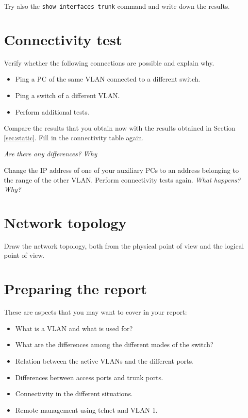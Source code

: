 Try also the \texttt{show interfaces trunk} command and write down the results.

\section{Connectivity test}

Verify whether the following connections are possible and explain why.
\begin{itemize}
\item Ping a PC of the same VLAN connected to a different switch.
\item Ping a  switch of a different VLAN.
\item Perform additional tests.
\end{itemize}

Compare the results that you obtain now with the results obtained in Section \ref{sec:static}.
Fill in the connectivity table again.

\emph{Are there any differences? Why}

Change the IP address of one of your auxiliary PCs to an address belonging to the range of the other VLAN.
Perform connectivity tests again.
\emph{What happens? Why?}

\section{Network topology}

Draw the network topology, both from the physical point of view and the logical point of view.

\section{Preparing the report}

These are aspects that you may want to cover in your report:
\begin{itemize}
\item What is a VLAN and what is used for?
\item What are the differences among the different modes of the switch?
\item Relation between the active VLANs and the different ports.
\item Differences between access ports and trunk ports.
\item Connectivity in the different situations.
\item Remote management using telnet and VLAN 1.
\end{itemize}













